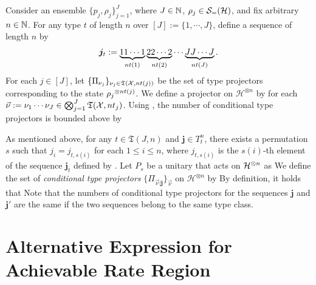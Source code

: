\documentclass[journal]{IEEEtran}
\begin{document}
\begin{lmm}
\begin{lmm}
Consider an ensemble $\{p_j,\rho_j\}_{j=1}^J$, where $J\in{\mathbb N}$, $\rho_j\in{\mathcal S}_=({\mathcal H})$, and fix arbitrary $n\in{\mathbb N}$.
For any type $t$ of length $n$ over $[J]:=\{1,\cdots,J\}$, define a sequence of length $n$ by
\begin{eqnarray}
{\bm j}_t
:=
\underbrace{11\cdots1}_{nt(1)}
\underbrace{22\cdots2}_{nt(2)}
\cdots 
\underbrace{JJ\cdots J}_{nt(J)}.
\laeq{dfnbfjt}
\end{eqnarray}
For each $j\in[J]$, 
let $\{\Pi_{\nu_j}\}_{\nu_j\in\mathfrak{T}({\mathcal X},nt(j))}$ be the set of type projectors corresponding to the state ${\rho_j}^{\otimes nt(j)}$. 
We define a projector on ${\mathcal H}^{\otimes n}$ by
for each $\vec{\nu}:=\nu_1\cdots\nu_J\in\bigotimes_{j=1}^J\mathfrak{T}({\mathcal X},nt_j)$.
Using , the number of conditional type projectors is bounded above by



As mentioned above, for any $t\in\mathfrak{T}(J,n)$ and ${\bm j}\in T_t^n$, there exists a permutation $s$ such that $j_i=j_{t,s(i)}$ for each $1\leq i\leq n$,
where $j_{t,s(i)}$ is the $s(i)$-th element of the sequence ${\bm j}_t$ defined by .
Let $P_s$ be a unitary that acts on ${\mathcal H}^{\otimes n}$ as
We define the set of {\it conditional type projectors} $\{\Pi_{\vec{\nu}|{\bm j}}\}_{\vec{\nu}}$ on ${\mathcal H}^{\otimes n}$ by
By definition, it holds that
Note that the numbers of conditional type projectors for the sequences ${\bm j}$ and ${\bm j}'$ are the same if the two sequences belong to the same type class.



\section{Alternative Expression for Achievable Rate Region}


\end{lmm}
\end{lmm}
\end{document}
